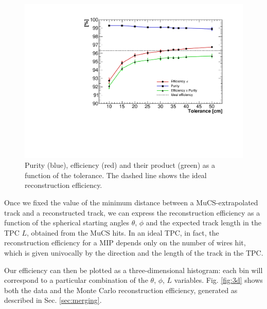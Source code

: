 \documentclass[a4paper]{scrartcl}
\begin{document}
\begin{figure}[htbp]
  \begin{center}
    \includegraphics[width=0.7\linewidth]{figures/tolerance.pdf}
    \caption{Purity (blue), efficiency (red) and their product (green) as a function of the tolerance. The dashed line shows the ideal reconstruction efficiency.} \label{fig:purity}
  \end{center}
\end{figure}

Once we fixed the value of the minimum distance between a MuCS-extrapolated track and a reconstructed track, we can express the reconstruction efficiency as a function of the spherical starting angles $\theta$, $\phi$ and the expected track length in the TPC $L$, obtained from the MuCS hits. In an ideal TPC, in fact, the reconstruction efficiency for a MIP depends only on the number of wires hit, which is given univocally by the direction and the length of the track in the TPC.

Our efficiency can then be plotted as a three-dimensional histogram: each bin will correspond to a particular combination of the $\theta$, $\phi$, $L$ variables. Fig. \ref{fig:3d} shows both the data and the Monte Carlo reconstruction efficiency, generated as described in Sec. \ref{sec:merging}.
\end{document}
